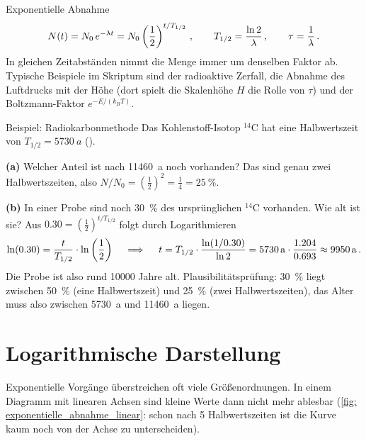 \begin{rememberbox}[]{Exponentielle Abnahme}
    \begin{equation*}
        N(t) = N_0 \, e^{-\lambda t} = N_0 \left(\frac{1}{2}\right)^{t/T_{1/2}} \,{,}\, \qquad T_{1/2} = \frac{\ln 2}{\lambda} \,{,}\, \qquad \tau = \frac{1}{\lambda} \,.
    \end{equation*}
    In gleichen Zeitabständen nimmt die Menge immer um denselben Faktor ab. Typische Beispiele im Skriptum sind der radioaktive Zerfall, die Abnahme des Luftdrucks mit der Höhe (dort spielt die Skalenhöhe $H$ die Rolle von $\tau$) und der Boltzmann-Faktor $e^{-E/(k_B T)}$.
\end{rememberbox}

\begin{examplebox}[]{Beispiel: Radiokarbonmethode}
    Das Kohlenstoff-Isotop $^{14}\mathrm{C}$ hat eine Halbwertszeit von $T_{1/2} = \SI{5730}{a}$ (\cite[S.~1424]{Giancoli2010}).

    \textbf{(a)} Welcher Anteil ist nach \SI{11460}{a} noch vorhanden? \newline
    Das sind genau zwei Halbwertszeiten, also $N/N_0 = \left(\frac{1}{2}\right)^2 = \frac{1}{4} = \SI{25}{\percent}$.

    \textbf{(b)} In einer Probe sind noch \SI{30}{\percent} des ursprünglichen $^{14}\mathrm{C}$ vorhanden. Wie alt ist sie? \newline
    Aus $\num{0.30} = \left(\frac{1}{2}\right)^{t/T_{1/2}}$ folgt durch Logarithmieren
    \begin{equation*}
        \ln(\num{0.30}) = \frac{t}{T_{1/2}} \cdot \ln\left(\frac{1}{2}\right)
        \quad\implies\quad
        t = T_{1/2} \cdot \frac{\ln(1/\num{0.30})}{\ln 2} = \SI{5730}{a} \cdot \frac{\num{1.204}}{\num{0.693}} \approx \SI{9950}{a} \,.
    \end{equation*}
    Die Probe ist also rund \num{10000} Jahre alt. Plausibilitätsprüfung: \SI{30}{\percent} liegt zwischen \SI{50}{\percent} (eine Halbwertszeit) und \SI{25}{\percent} (zwei Halbwertszeiten), das Alter muss also zwischen \SI{5730}{a} und \SI{11460}{a} liegen.
\end{examplebox}

\section{Logarithmische Darstellung}\label{sec: logarithmische_Darstellung}
Exponentielle Vorgänge überstreichen oft viele Größenordnungen. In einem Diagramm mit linearen Achsen sind kleine Werte dann nicht mehr ablesbar (\cref{fig: exponentielle_abnahme_linear}: schon nach 5 Halbwertszeiten ist die Kurve kaum noch von der Achse zu unterscheiden).

